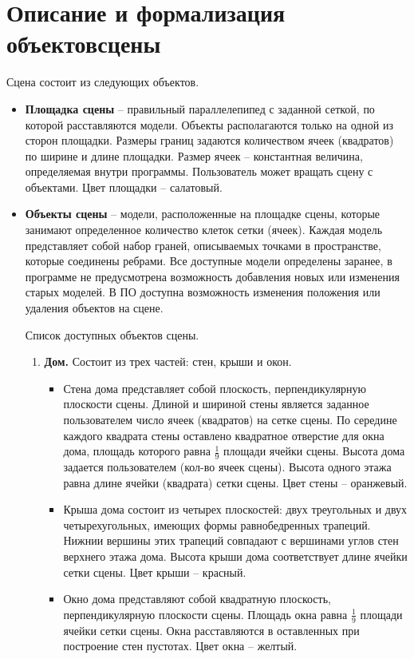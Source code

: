 \documentclass[a4paper,14pt, unknownkeysallowed]{extreport}
\begin{document}
\section[Описание и формализация объектов сцены]{Описание и формализация объектов\linebreak сцены}

Сцена состоит из следующих объектов.

\begin{itemize}
	\item \textbf{Площадка сцены} -- правильный параллелепипед с заданной сеткой, по которой расставляются модели. Объекты располагаются только на одной из сторон площадки. Размеры границ задаются количеством ячеек (квадратов) по ширине и длине площадки. Размер ячеек -- константная величина, определяемая внутри программы. Пользователь может вращать сцену с объектами. Цвет площадки -- салатовый.
	\item \textbf{Объекты сцены}  -- модели, расположенные на площадке сцены, которые занимают определенное количество клеток сетки (ячеек). Каждая модель представляет собой набор граней, описываемых точками в пространстве, которые соединены ребрами. Все доступные модели определены заранее, в программе не предусмотрена возможность добавления новых или изменения старых моделей. В ПО доступна возможность изменения положения или удаления объектов на сцене.
	
	Список доступных объектов сцены.
	\begin{enumerate}
		\item \textbf{Дом.} Состоит из трех частей: стен, крыши и окон. 
		
		\begin{itemize}
			\item Стена дома представляет собой плоскость, перпендикулярную плоскости сцены. Длиной и шириной стены является заданное пользователем число ячеек (квадратов) на сетке сцены. По середине каждого квадрата стены оставлено квадратное отверстие для окна дома, площадь которого равна $\frac{1}{9}$ площади ячейки сцены. Высота дома задается пользователем (кол-во ячеек сцены). Высота одного этажа равна длине ячейки (квадрата) сетки сцены. Цвет стены -- оранжевый.
			\item Крыша дома состоит из четырех плоскостей: двух треугольных и двух четырехугольных, имеющих формы равнобедренных трапеций. Нижнии вершины этих трапеций совпадают с вершинами углов стен верхнего этажа дома. Высота крыши дома соответствует длине ячейки сетки сцены. Цвет крыши -- красный.
			\item Окно дома представляют собой квадратную плоскость, перпендикулярную плоскости сцены. Площадь окна равна $\frac{1}{9}$ площади ячейки сетки сцены. Окна расставляются в оставленных при построение стен пустотах. Цвет окна -- желтый.
		\end{itemize}


\end{enumerate}
\end{itemize}
\end{document}
